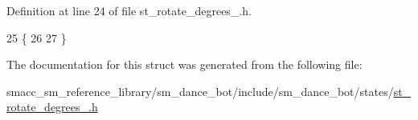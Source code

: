 Definition at line 24 of file st\+\_\+rotate\+\_\+degrees\+\_.\+h.


\begin{DoxyCode}
25   \{
26     
27   \}
\end{DoxyCode}


The documentation for this struct was generated from the following file\+:\begin{DoxyCompactItemize}
\item 
smacc\+\_\+sm\+\_\+reference\+\_\+library/sm\+\_\+dance\+\_\+bot/include/sm\+\_\+dance\+\_\+bot/states/\hyperlink{st__rotate__degrees__2_8h}{st\+\_\+rotate\+\_\+degrees\+\_.\+h}\end{DoxyCompactItemize}
